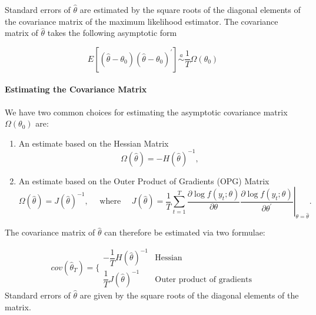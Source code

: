 \documentclass[11pt]{article}
\begin{document}
Standard errors of $\hat{\theta}$ are estimated by the square roots of the diagonal elements of the covariance matrix of the maximum likelihood estimator. The covariance matrix of $\hat{\theta}$ takes the following asymptotic form

\begin{equation}
E\left[\left(\widehat{\theta}-\theta_0\right)\left(\widehat{\theta}-\theta_0\right)^{\prime}\right] \stackrel{a}{\sim} \dfrac{1}{T}\Omega\left(\theta_0\right)
\end{equation}

\paragraph{Estimating the Covariance Matrix} \mbox{}

\begin{procedure}
We have two common choices for estimating the asymptotic covariance matrix $\Omega(\theta_0)$ are:
    \begin{enumerate}
        \item An estimate based on the Hessian Matrix
        \[\Omega(\hat{\theta}) = -H(\hat{\theta})^{-1},\]

        \item An estimate based on the Outer Product of Gradients (OPG) Matrix
        \begin{equation}
\Omega(\widehat{\theta})=J(\widehat{\theta})^{-1}, \quad \text { where } \quad J(\widehat{\theta})=\left.\frac{1}{T} \sum_{t=1}^T \frac{\partial \log f\left(y_t ; \theta\right)}{\partial \theta} \frac{\partial \log f\left(y_t ; \theta\right)}{\partial \theta^{\prime}}\right|_{\theta=\widehat{\theta}} .
\end{equation}
    \end{enumerate}

    The covariance matrix of $\hat{\theta}$ can therefore be estimated via two formulae:
    
    \begin{equation}
        cov(\hat{\theta}_T) = \Biggl\{ \begin{array}{cc}
            -\dfrac{1}{T}H(\hat{\theta})^{-1} & \text{Hessian}  \\
             \dfrac{1}{T}J(\hat{\theta})^{-1}& \text{Outer product of gradients} 
        \end{array}
    \end{equation}
    Standard errors of $\hat{\theta}$ are given by the square roots of the diagonal elements of the matrix.
\end{procedure}
\end{document}
